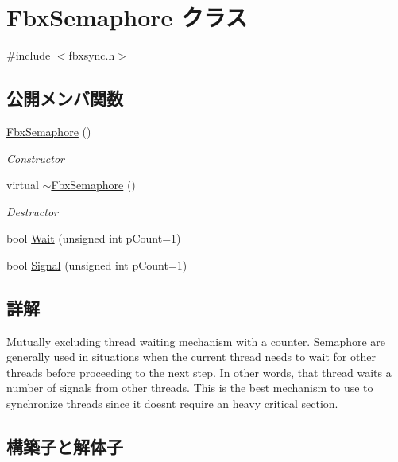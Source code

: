\hypertarget{class_fbx_semaphore}{}\section{Fbx\+Semaphore クラス}
\label{class_fbx_semaphore}


{\ttfamily \#include $<$fbxsync.\+h$>$}

\subsection*{公開メンバ関数}
\begin{DoxyCompactItemize}
\item 
\hyperlink{class_fbx_semaphore_a4c1d63129606a43f25d00cebe24eb239}{Fbx\+Semaphore} ()
\begin{DoxyCompactList}\small\item\em Constructor \end{DoxyCompactList}\item 
virtual \hyperlink{class_fbx_semaphore_aea00e26f6b9452107104eaf2f2e49f1b}{$\sim$\+Fbx\+Semaphore} ()
\begin{DoxyCompactList}\small\item\em Destructor \end{DoxyCompactList}\item 
bool \hyperlink{class_fbx_semaphore_a05d7cdaa49c89691f22a26851be1f885}{Wait} (unsigned int p\+Count=1)
\item 
bool \hyperlink{class_fbx_semaphore_a56bdff92c29ea31a57003f207e52c672}{Signal} (unsigned int p\+Count=1)
\end{DoxyCompactItemize}


\subsection{詳解}
Mutually excluding thread waiting mechanism with a counter. Semaphore are generally used in situations when the current thread needs to wait for other threads before proceeding to the next step. In other words, that thread waits a number of signals from other threads. This is the best mechanism to use to synchronize threads since it doesn\textquotesingle{}t require an heavy critical section. 

\subsection{構築子と解体子}
\mbox{\label{class_fbx_semaphore_a4c1d63129606a43f25d00cebe24eb239}} 
